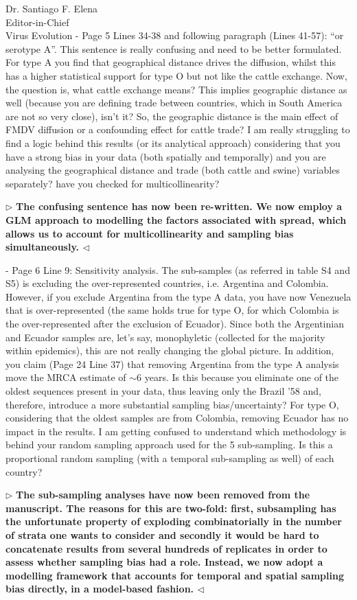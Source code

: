 \documentclass[ucla,biomath,12pt,noaddrfooter,datefrom]{UC_letter}
\newenvironment{reply}{$\triangleright$\bf}{$\triangleleft$}
\begin{document}
\begin{letter}{
Dr. Santiago F. Elena \\
Editor-in-Chief \\
Virus Evolution
}
-       Page 5 Lines 34-38 and following paragraph (Lines 41-57): ``or serotype A''. 
This sentence is really confusing and need to be better formulated. 
For type A you find that geographical distance drives the diffusion, whilst this has a higher statistical support for type O but not like the cattle exchange. 
Now, the question is, what cattle exchange means? 
This implies geographic distance as well (because you are defining trade between countries, which in South America are not so very close), isn't it? 
So, the geographic distance is the main effect of FMDV diffusion or a confounding effect for cattle trade? 
I am really struggling to find a logic behind this results (or its analytical approach) considering that you have a strong bias in your data (both spatially and temporally) and you are analysing the geographical distance and trade (both cattle and swine) variables separately? have you checked for multicollinearity?

\begin{reply}
The confusing sentence has now been re-written.
We now employ a GLM approach to modelling the factors associated with spread, which allows us to account for multicollinearity and sampling bias simultaneously.
\end{reply}

-       Page 6 Line 9: Sensitivity analysis. 
The sub-samples (as referred in table S4 and S5) is excluding the over-represented countries, i.e. Argentina and Colombia. 
However, if you exclude Argentina from the type A data, you have now Venezuela that is over-represented (the same holds true for type O, for which Colombia is the over-represented after the exclusion of Ecuador). 
Since both the Argentinian and Ecuador samples are, let's say, monophyletic (collected for the majority within epidemics), this are not really changing the global picture. 
In addition, you claim (Page 24 Line 37) that removing Argentina from the type A analysis move the MRCA estimate of $\sim$6 years. Is this because you eliminate one of the oldest sequences present in your data, thus leaving only the Brazil '58 and, therefore, introduce a more substantial sampling bias/uncertainty? 
For type O, considering that the oldest samples are from Colombia, removing Ecuador has no impact in the results. 
I am getting confused to understand which methodology is behind your random sampling approach used for the 5 sub-sampling. Is this a proportional random sampling (with a temporal sub-sampling as well) of each country?

\begin{reply}
The sub-sampling analyses have now been removed from the manuscript.
The reasons for this are two-fold: first, subsampling has the unfortunate property of exploding combinatorially in the number of strata one wants to consider and secondly it would be hard to concatenate results from several hundreds of replicates in order to assess whether sampling bias had a role.
Instead, we now adopt a modelling framework that accounts for temporal and spatial sampling bias directly, in a model-based fashion.
\end{reply}


\end{letter}
\end{document}
